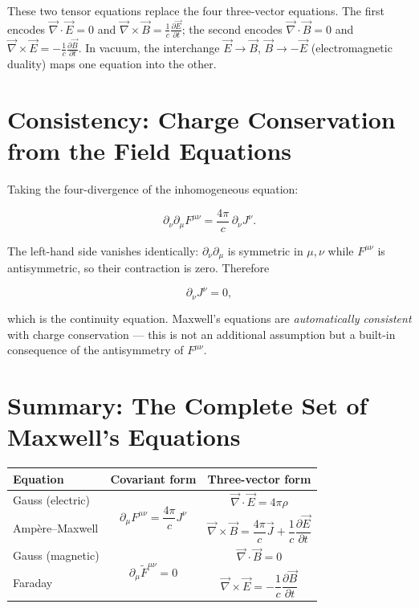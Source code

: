 These two tensor equations replace the four three-vector equations. The first encodes $\vec{\nabla}\cdot\vec{E} = 0$ and $\vec{\nabla}\times\vec{B} = \frac{1}{c}\frac{\partial\vec{E}}{\partial t}$; the second encodes $\vec{\nabla}\cdot\vec{B} = 0$ and $\vec{\nabla}\times\vec{E} = -\frac{1}{c}\frac{\partial\vec{B}}{\partial t}$. In vacuum, the interchange $\vec{E} \to \vec{B}$, $\vec{B} \to -\vec{E}$ (electromagnetic duality) maps one equation into the other.

\section{Consistency: Charge Conservation from the Field Equations}

Taking the four-divergence of the inhomogeneous equation:

\begin{equation}
\partial_\nu\partial_\mu F^{\mu\nu} = \frac{4\pi}{c}\,\partial_\nu J^\nu.
\end{equation}

The left-hand side vanishes identically: $\partial_\nu\partial_\mu$ is symmetric in $\mu,\nu$ while $F^{\mu\nu}$ is antisymmetric, so their contraction is zero. Therefore

\begin{equation}
\partial_\nu J^\nu = 0,
\end{equation}

which is the continuity equation. Maxwell's equations are \emph{automatically consistent} with charge conservation --- this is not an additional assumption but a built-in consequence of the antisymmetry of $F^{\mu\nu}$.

\section{Summary: The Complete Set of Maxwell's Equations}

\begin{table}[h]
\centering
\renewcommand{\arraystretch}{1.6}
\begin{tabular}{lcc}
\toprule
\textbf{Equation} & \textbf{Covariant form} & \textbf{Three-vector form} \\
\midrule
Gauss (electric) & \multirow{2}{*}{$\partial_\mu F^{\mu\nu} = \dfrac{4\pi}{c}J^\nu$} & $\vec{\nabla}\cdot\vec{E} = 4\pi\rho$ \\
Amp\`ere--Maxwell & & $\vec{\nabla}\times\vec{B} = \dfrac{4\pi}{c}\vec{J} + \dfrac{1}{c}\dfrac{\partial\vec{E}}{\partial t}$ \\[6pt]
\midrule
Gauss (magnetic) & \multirow{2}{*}{$\partial_\mu\widetilde{F}^{\mu\nu} = 0$} & $\vec{\nabla}\cdot\vec{B} = 0$ \\
Faraday & & $\vec{\nabla}\times\vec{E} = -\dfrac{1}{c}\dfrac{\partial\vec{B}}{\partial t}$ \\
\bottomrule
\end{tabular}
\end{table}

